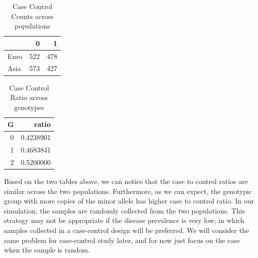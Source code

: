 \documentclass[
]{article}
\newenvironment{Shaded}{\begin{snugshade}}{\end{snugshade}}
\newcommand{\CommentTok}[1]{\textcolor[rgb]{0.56,0.35,0.01}{\textit{#1}}}
\newcommand{\DataTypeTok}[1]{\textcolor[rgb]{0.13,0.29,0.53}{#1}}
\newcommand{\DecValTok}[1]{\textcolor[rgb]{0.00,0.00,0.81}{#1}}
\newcommand{\KeywordTok}[1]{\textcolor[rgb]{0.13,0.29,0.53}{\textbf{#1}}}
\newcommand{\NormalTok}[1]{#1}
\newcommand{\OperatorTok}[1]{\textcolor[rgb]{0.81,0.36,0.00}{\textbf{#1}}}
\newcommand{\StringTok}[1]{\textcolor[rgb]{0.31,0.60,0.02}{#1}}
\begin{document}
\begin{table}[H]

\caption{\label{tab:simulatedData}Case Control Counts across populations}
\centering
\fontsize{10}{12}\selectfont
\begin{tabular}[t]{l|r|r}
\hline
  & 0 & 1\\
\hline
Euro & 522 & 478\\
\hline
Asia & 573 & 427\\
\hline
\end{tabular}
\end{table}

\begin{Shaded}
\end{Shaded}

\begin{table}[H]

\caption{\label{tab:simulatedData}Case Control Ratio across genotypes}
\centering
\fontsize{10}{12}\selectfont
\begin{tabular}[t]{r|r}
\hline
G & ratio\\
\hline
0 & 0.4238901\\
\hline
1 & 0.4683841\\
\hline
2 & 0.5200000\\
\hline
\end{tabular}
\end{table}

Based on the two tables above, we can notice that the case to control
ratios are similar across the two populations. Furthermore, as we can
expect, the genotypic group with more copies of the minor allele has
higher case to control ratio. In our simulation, the samples are
randomly collected from the two populations. This strategy may not be
appropriate if the disease prevalence is very low, in which samples
collected in a case-control design will be preferred. We will consider
the same problem for case-control study later, and for now just focus on
the case when the sample is random.
\end{document}
